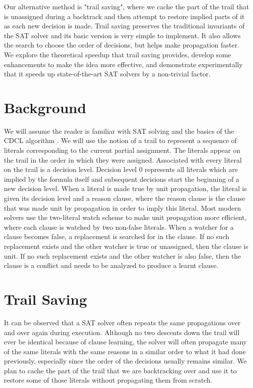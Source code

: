 \documentclass{article}
\begin{document}
Our alternative method is "trail saving", where we cache the part of the trail that is unassigned during a backtrack and then attempt to restore implied parts of it as each new decision is made. Trail saving preserves the traditional invariants of the SAT solver and its basic version is very simple to implement. It also allows the search to choose the order of decisions, but helps make propagation faster. We explore the theoretical speedup that trail saving provides, develop some enhancements to make the idea more effective, and demonstrate experimentally that it speeds up state-of-the-art SAT solvers by a non-trivial factor.

\section{Background}
We will assume the reader is familiar with SAT solving and the basics of the CDCL algorithm \cite{DBLP:series/faia/SilvaLM09}. We will use the notion of a trail to represent a sequence of literals corresponding to the current partial assignment. The literals appear on the trail in the order in which they were assigned. Associated with every literal on the trail is a decision level. Decision level 0 represents all literals which are implied by the formula itself and subsequent decisions start the beginning of a new decision level. When a literal is made true by unit propagation, the literal is given its decision level and a reason clause, where the reason clause is the clause that was made unit by propagation in order to imply this literal. Most modern solvers use the two-literal watch scheme to make unit propagation more efficient, where each clause is watched by two non-false literals. When a watcher for a clause becomes false, a replacement is searched for in the clause. If no such replacement exists and the other watcher is true or unassigned, then the clause is unit. If no such replacement exists and the other watcher is also false, then the clause is a conflict and needs to be analyzed to produce a learnt clause.

\section{Trail Saving}
It can be observed that a SAT solver often repeats the same propagations over and over again during execution. Although no two descents down the trail will ever be identical because of clause learning, the solver will often propagate many of the same literals with the same reasons in a similar order to what it had done previously, especially since the order of the decisions usually remains similar. We plan to cache the part of the trail that we are backtracking over and use it to restore some of those literals without propagating them from scratch.
\end{document}
